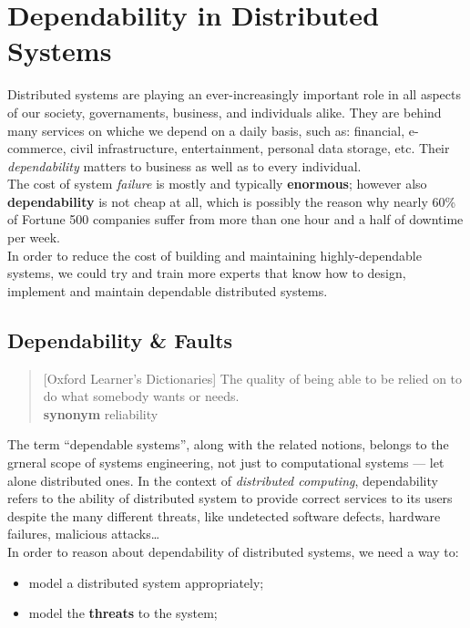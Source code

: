 \documentclass[11pt, a4paper]{article}
\begin{document}
\section{Dependability in Distributed Systems}\label{sec:dependability_in_distributed_systems} %
Distributed systems are playing an ever-increasingly important role in all aspects of our society, governaments, business, and individuals alike.
They are behind many services on whiche we depend on a daily basis, such as: financial, e-commerce, civil infrastructure, entertainment, personal data storage, etc.
Their \textit{dependability} matters to business as well as to every individual.
\\
The cost of system \textit{failure} is mostly and typically \textbf{enormous}; however also \textbf{dependability} is not cheap at all, which is possibly the reason why nearly 60\% of Fortune 500 companies suffer from more than one hour and a half of downtime per week.
\\
In order to reduce the cost of building and maintaining highly-dependable systems, we could try and train more experts that know how to design, implement and maintain dependable distributed systems.
%
\subsection{Dependability \& Faults}\label{sub:dependability_faults} %
\begin{quote}[Oxford Learner's Dictionaries]
    The quality of being able to be relied on to do what somebody wants or needs.
    \\
    \textbf{synonym} reliability
\end{quote}
The term ``dependable systems'', along with the related notions, belongs to the grneral scope of systems engineering, not just to computational systems --- let alone distributed ones.
In the context of \textit{distributed computing}, dependability refers to the ability of distributed system to provide correct services to its users despite the many different threats, like undetected software defects, hardware failures, malicious attacks\ldots
\\
In order to reason about dependability of distributed systems, we need a way to:
\begin{itemize}
    \item model a distributed system appropriately;
    \item model the \textbf{threats} to the system;
\end{itemize}
%
%
\end{document}
